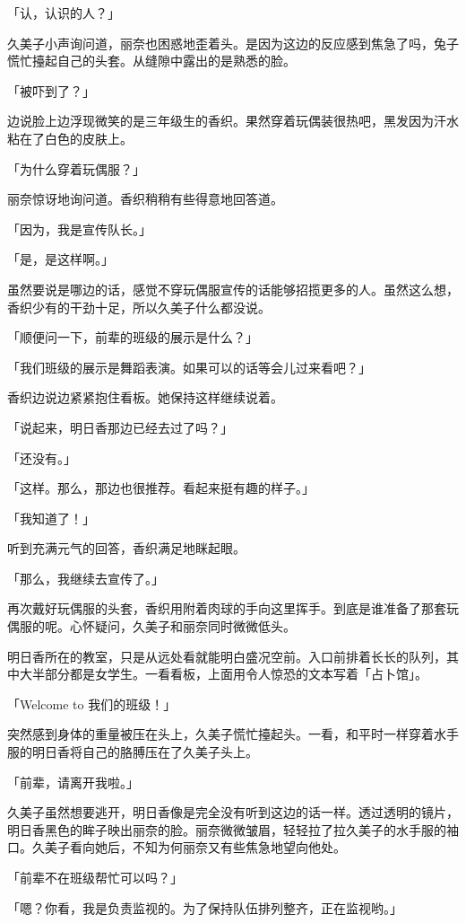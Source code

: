 \documentclass[UTF8]{ctexart}
\begin{document}
    「认，认识的人？」

    久美子小声询问道，丽奈也困惑地歪着头。是因为这边的反应感到焦急了吗，兔子慌忙擡起自己的头套。从缝隙中露出的是熟悉的脸。

    「被吓到了？」

    边说脸上边浮现微笑的是三年级生的香织。果然穿着玩偶装很热吧，黑发因为汗水粘在了白色的皮肤上。

    「为什么穿着玩偶服？」

    丽奈惊讶地询问道。香织稍稍有些得意地回答道。

    「因为，我是宣传队长。」

    「是，是这样啊。」

    虽然要说是哪边的话，感觉不穿玩偶服宣传的话能够招揽更多的人。虽然这么想，香织少有的干劲十足，所以久美子什么都没说。

    「顺便问一下，前辈的班级的展示是什么？」

    「我们班级的展示是舞蹈表演。如果可以的话等会儿过来看吧？」

    香织边说边紧紧抱住看板。她保持这样继续说着。

    「说起来，明日香那边已经去过了吗？」

    「还没有。」

    「这样。那么，那边也很推荐。看起来挺有趣的样子。」

    「我知道了！」

    听到充满元气的回答，香织满足地眯起眼。

    「那么，我继续去宣传了。」

    再次戴好玩偶服的头套，香织用附着肉球的手向这里挥手。到底是谁准备了那套玩偶服的呢。心怀疑问，久美子和丽奈同时微微低头。

    明日香所在的教室，只是从远处看就能明白盛况空前。入口前排着长长的队列，其中大半部分都是女学生。一看看板，上面用令人惊恐的文本写着「占卜馆」。

    「Welcome to 我们的班级！」

    突然感到身体的重量被压在头上，久美子慌忙擡起头。一看，和平时一样穿着水手服的明日香将自己的胳膊压在了久美子头上。

    「前辈，请离开我啦。」

    久美子虽然想要逃开，明日香像是完全没有听到这边的话一样。透过透明的镜片，明日香黑色的眸子映出丽奈的脸。丽奈微微皱眉，轻轻拉了拉久美子的水手服的袖口。久美子看向她后，不知为何丽奈又有些焦急地望向他处。

    「前辈不在班级帮忙可以吗？」

    「嗯？你看，我是负责监视的。为了保持队伍排列整齐，正在监视哟。」
\end{document}
